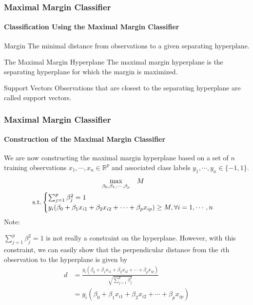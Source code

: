 \documentclass{beamer}
\begin{document}
\begin{frame}
    \frametitle{Maximal Margin Classifier}
    \framesubtitle{Classification Using the Maximal Margin Classifier}
    \begin{block}{Margin}
        The minimal distance from observations to a given separating hyperplane.
    \end{block}

    \begin{block}{The Maximal Margin Hyperplane}
        The maximal margin hyperplane is the separating hyperplane 
        for which the margin is maximized.
    \end{block}

    \begin{block}{Support Vectors}
        Observations that are closest to the separating hyperplane are called support vectors.
    \end{block}
\end{frame}




\begin{frame}
    \frametitle{Maximal Margin Classifier}
    \framesubtitle{Construction of the Maximal Margin Classifier}
    We are now constructing the maximal margin hyperplane based on a set 
    of $n$ training observations $x_1, \cdots, x_n \in \mathbb{R}^p$ and 
    associated class labels $y_1, \cdots, y_n \in \{-1,1\}$. 
    \begin{gather*}
        \underset{\beta_0,\beta_1,\cdots,\beta_p}{\max} \quad M \quad \\
        \text{s.t.}
        \begin{cases}
            \sum_{j=1}^{p}\beta_j^2=1 \\
            y_i(\beta_0+\beta_1x_{i1}+\beta_2x_{i2}+\cdots+\beta_px_{ip})\geq M, \forall \space i=1,\cdots,n
        \end{cases}
    \end{gather*}
    Note:

    $\sum_{j=1}^{p}\beta_j^2=1$ is not really a constraint on the hyperplane. 
    However, with this constraint, we can easily show that the perpendicular 
    distance from the $i$th observation to the hyperplane is given by 
    \begin{align*}
        d&=\frac{y_i(\beta_0+\beta_1x_{i1}+\beta_2x_{i2}+\cdots+\beta_px_{ip})}{\sqrt{\sum_{j=1}^{p}\beta_j^2}} \\
        &=y_i(\beta_0+\beta_1x_{i1}+\beta_2x_{i2}+\cdots+\beta_px_{ip})
    \end{align*}
\end{frame}
\end{document}
